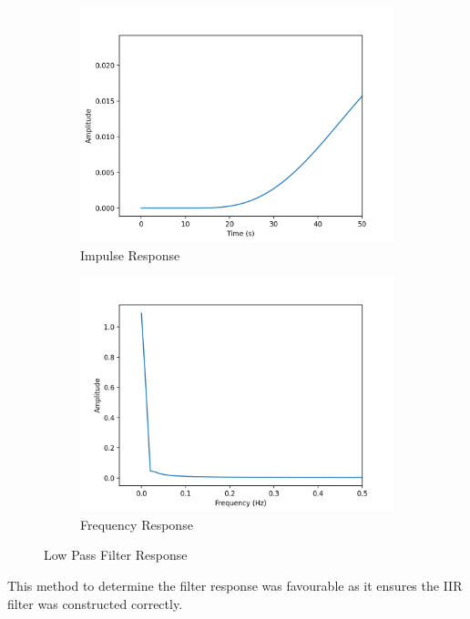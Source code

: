 \documentclass{article}
\begin{document}
\begin{figure}[H]
\centering
\begin{subfigure}{.5\textwidth}
  \centering
  \includegraphics[scale=0.4]{iResponse}
  \caption{Impulse Response}
  \label{fig:a}
\end{subfigure}%
\begin{subfigure}{.5\textwidth}
  \centering
  \includegraphics[scale=0.4]{fResponse}
  \caption{Frequency Response}
  \label{fig:b}
\end{subfigure}
\caption{Low Pass Filter Response}
\label{fig:reponse}
\end{figure}
This method to determine the filter response was favourable as it ensures the IIR filter was constructed correctly.
\end{document}

